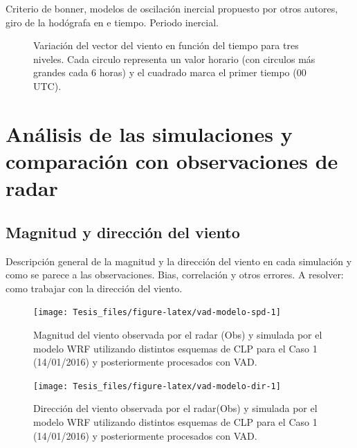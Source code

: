 \documentclass[12pt,spanish,oneside]{book}
\begin{document}
Criterio de bonner, modelos de oscilación inercial propuesto por otros
autores, giro de la hodógrafa en e tiempo. Periodo inercial.

\begin{figure}

{\centering {}\newline{}

}

\caption{Variación del vector del viento en función del tiempo para tres niveles. Cada circulo representa un valor horario (con circulos más grandes cada 6 horas) y el cuadrado marca el primer tiempo (00 UTC). \label{hodografa-n}}\label{fig:hodografa-nivel}
\end{figure}

\section{Análisis de las simulaciones y comparación con observaciones de
radar}\label{analisis-de-las-simulaciones-y-comparacion-con-observaciones-de-radar}

\subsection{Magnitud y dirección del
viento}\label{magnitud-y-direccion-del-viento}

Descripción general de la magnitud y la dirección del viento en cada
simulación y como se parece a las observaciones. Bias, correlación y
otros errores. A resolver: como trabajar con la dirección del viento.

\begin{figure}

{\centering \texttt{[image: Tesis\_files/figure-latex/vad-modelo-spd-1]} 

}

\caption{Magnitud del viento observada por el radar (Obs) y simulada por el modelo WRF utilizando distintos esquemas de CLP para el Caso 1 (14/01/2016) y posteriormente procesados con VAD. \label{modelo-spd}}\label{fig:vad-modelo-spd}
\end{figure}

\begin{figure}

{\centering \texttt{[image: Tesis\_files/figure-latex/vad-modelo-dir-1]} 

}

\caption{Dirección del viento observada por el radar(Obs) y simulada por el modelo WRF utilizando distintos esquemas de CLP para el Caso 1 (14/01/2016) y posteriormente procesados con VAD. \label{modelo-dir}}\label{fig:vad-modelo-dir}
\end{figure}
\end{document}
